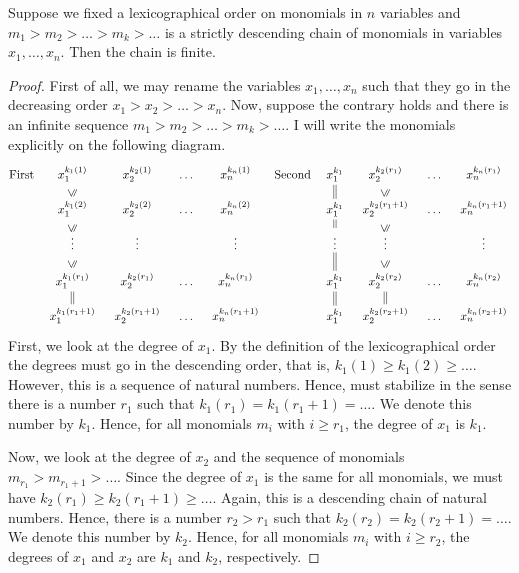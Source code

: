\begin{claim}
\label{claim::LexWellOrder}
Suppose we fixed a lexicographical order on monomials in $n$ variables and $m_1 > m_2 > \ldots > m_k > \ldots$ is a strictly descending chain of monomials in variables $x_1,\ldots,x_n$.
Then the chain is finite.
\end{claim}
\begin{proof}
First of all, we may rename the variables $x_1,\ldots,x_n$ such that they go in the decreasing order $x_1>x_2>\ldots>x_n$.
Now, suppose the contrary holds and there is an infinite sequence $m_1>m_2>\ldots>m_k>\ldots$.
I will write the monomials explicitly on the following diagram.
\[
\text{First}\quad
\xymatrix@R=10pt@C=10pt{
	{x_1^{k_1(1)}}&{x_2^{k_2(1)}}&{\ldots}&{x_n^{k_n(1)}}\\
	{x_1^{k_1(2)}}\ar@{}[u]|{\rotatebox{90}{$\leqslant$}}&{x_2^{k_2(2)}}&{\ldots}&{x_n^{k_n(2)}}\\
	{\vdots}\ar@{}[u]|{\rotatebox{90}{$\leqslant$}}&{\vdots}&{}&{\vdots}\\
	{x_1^{k_1(r_1)}}\ar@{}[u]|{\rotatebox{90}{$\leqslant$}}&{x_2^{k_2(r_1)}}&{\ldots}&{x_n^{k_n(r_1)}}\\
	{x_1^{k_1(r_1+1)}}\ar@{=}[u]&{x_2^{k_2(r_1+1)}}&{\ldots}&{x_n^{k_n(r_1+1)}}\\
}
\quad\text{Second}\quad
\xymatrix@R=10pt@C=10pt{
	{x_1^{k_1}}&{x_2^{k_2(r_1)}}&{\ldots}&{x_n^{k_n(r_1)}}\\
	{x_1^{k_1}}\ar@{=}[u]&{x_2^{k_2(r_1+1)}}\ar@{}[u]|{\rotatebox{90}{$\leqslant$}}&{\ldots}&{x_n^{k_n(r_1+1)}}\\
	{\vdots}\ar@{=}[u]&{\vdots}\ar@{}[u]|{\rotatebox{90}{$\leqslant$}}&{}&{\vdots}\\
	{x_1^{k_1}}\ar@{=}[u]&{x_2^{k_2(r_2)}}\ar@{}[u]|{\rotatebox{90}{$\leqslant$}}&{\ldots}&{x_n^{k_n(r_2)}}\\
	{x_1^{k_1}}\ar@{=}[u]&{x_2^{k_2(r_2+1)}}\ar@{=}[u]&{\ldots}&{x_n^{k_n(r_2+1)}}\\
}
\]
First, we look at the degree of $x_1$.
By the definition of the lexicographical order the degrees must go in the descending order, that is, $k_1(1) \geqslant k_1(2)\geqslant \ldots$.
However, this is a sequence of natural numbers.
Hence, must stabilize in the sense there is a number $r_1$ such that $k_1(r_1) = k_1(r_1+1) = \ldots$.
We denote this number by $k_1$.
Hence, for all monomials $m_i$ with $i \geqslant r_1$, the degree of $x_1$ is $k_1$.

Now, we look at the degree of $x_2$ and the sequence of monomials $m_{r_1}>m_{r_1+1}>\ldots$.
Since the degree of $x_1$ is the same for all monomials, we must have $k_2(r_1)\geqslant k_2(r_1+1)\geqslant \ldots$.
Again, this is a descending chain of natural numbers.
Hence, there is a number $r_2 > r_1$ such that $k_2(r_2) = k_2(r_2+1) = \ldots$.
We denote this number by $k_2$.
Hence, for all monomials $m_i$ with $i \geqslant r_2$, the  degrees of $x_1$ and $x_2$ are  $k_1$ and $k_2$, respectively.


\end{proof}
